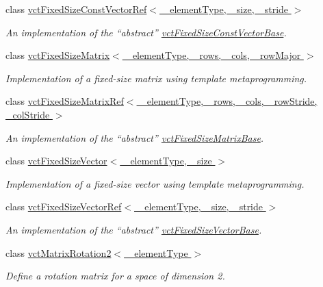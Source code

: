 \begin{DoxyCompactItemize}
class \hyperlink{classvct_fixed_size_const_vector_ref}{vct\-Fixed\-Size\-Const\-Vector\-Ref$<$ \-\_\-element\-Type, \-\_\-size, \-\_\-stride $>$}
\begin{DoxyCompactList}\small\item\em An implementation of the ``abstract'' \hyperlink{classvct_fixed_size_const_vector_base}{vct\-Fixed\-Size\-Const\-Vector\-Base}. \end{DoxyCompactList}\item 
class \hyperlink{classvct_fixed_size_matrix}{vct\-Fixed\-Size\-Matrix$<$ \-\_\-element\-Type, \-\_\-rows, \-\_\-cols, \-\_\-row\-Major $>$}
\begin{DoxyCompactList}\small\item\em Implementation of a fixed-\/size matrix using template metaprogramming. \end{DoxyCompactList}\item 
class \hyperlink{classvct_fixed_size_matrix_ref}{vct\-Fixed\-Size\-Matrix\-Ref$<$ \-\_\-element\-Type, \-\_\-rows, \-\_\-cols, \-\_\-row\-Stride, \-\_\-col\-Stride $>$}
\begin{DoxyCompactList}\small\item\em An implementation of the ``abstract'' \hyperlink{classvct_fixed_size_matrix_base}{vct\-Fixed\-Size\-Matrix\-Base}. \end{DoxyCompactList}\item 
class \hyperlink{classvct_fixed_size_vector}{vct\-Fixed\-Size\-Vector$<$ \-\_\-element\-Type, \-\_\-size $>$}
\begin{DoxyCompactList}\small\item\em Implementation of a fixed-\/size vector using template metaprogramming. \end{DoxyCompactList}\item 
class \hyperlink{classvct_fixed_size_vector_ref}{vct\-Fixed\-Size\-Vector\-Ref$<$ \-\_\-element\-Type, \-\_\-size, \-\_\-stride $>$}
\begin{DoxyCompactList}\small\item\em An implementation of the ``abstract'' \hyperlink{classvct_fixed_size_vector_base}{vct\-Fixed\-Size\-Vector\-Base}. \end{DoxyCompactList}\item 
class \hyperlink{classvct_matrix_rotation2}{vct\-Matrix\-Rotation2$<$ \-\_\-element\-Type $>$}
\begin{DoxyCompactList}\small\item\em Define a rotation matrix for a space of dimension 2. \end{DoxyCompactList}\item 

\end{DoxyCompactItemize}
